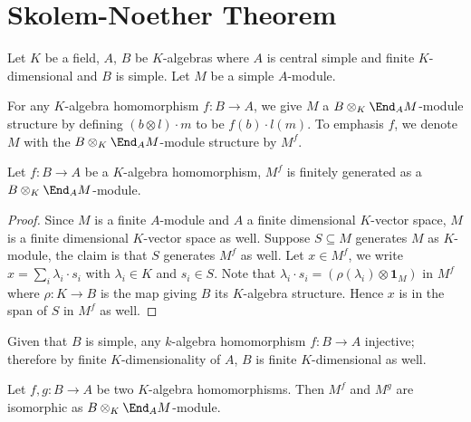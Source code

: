 \section{Skolem-Noether Theorem}\label{sec:skolem-noether}

Let $K$ be a field, $A$, $B$ be $K$-algebras where $A$ is central simple and
finite $K$-dimensional and $B$ is simple. Let $M$ be a simple $A$-module.

\begin{construction}
  For any $K$-algebra homomorphism $f : B \to A$, we give $M$ a
  $B \otimes_{K}\End_{A}M$-module structure by defining $(b\otimes l)\cdot m$ to
  be $f(b)\cdot l(m)$. To emphasis $f$, we denote $M$ with the
  $B\otimes_{K}\End_{A}M$-module structure by $M^{f}$.
  \leanok
\end{construction}

\begin{lemma}
  Let $f : B \to A$ be a $K$-algebra homomorphism, $M^{f}$ is finitely generated
  as a $B\otimes_{K}\End_{A}M$-module.
  \leanok
\end{lemma}
\begin{proof}
  Since $M$ is a finite $A$-module and $A$ a finite dimensional $K$-vector
  space, $M$ is a finite dimensional $K$-vector space as well. Suppose
  $S \subseteq M$ generates $M$ as $K$-module, the claim is that $S$ generates
  $M^{f}$ as well. Let $x \in M^{f}$, we write
  $x = \sum_{i}\lambda_{i}\cdot s_{i}$ with $\lambda_{i}\in K$ and $s_{i}\in S$.
  Note that $\lambda_{i}\cdot s_{i} = (\rho(\lambda_{i})\otimes\mathbf{1}_{M})$
  in $M^{f}$ where $\rho : K \to B$ is the map giving $B$ its $K$-algebra
  structure. Hence $x$ is in the span of $S$ in $M^{f}$ as well.
\end{proof}

\begin{remark}
  Given that $B$ is simple, any $k$-algebra homomorphism $f : B\to A$ injective;
  therefore by finite $K$-dimensionality of $A$, $B$ is finite $K$-dimensional
  as well.
\end{remark}

\begin{lemma}
  \label{lem:iso-fg}
  Let $f,g : B \to A$ be two $K$-algebra homomorphisms. Then $M^{f}$ and $M^{g}$
  are isomorphic as $B\otimes_{K}\End_{A}M$-module.
  \leanok
\end{lemma}

